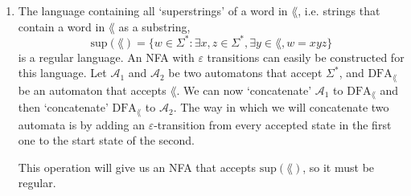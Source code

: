 \documentclass[fleqn]{article}
\begin{document}
\begin{answers}
\begin{enumerate}
		\item %
		The language containing all `superstrings' of a word in \(\lang\), i.e. strings that contain a word in \(\lang\) as a substring,
		\[\text{sup}(\lang) = \{w \in \Sigma^* : \exists x,z \in \Sigma^*, \exists y \in \lang, w=xyz\}\]
		is a regular language. An NFA with \(\varepsilon\) transitions can easily be constructed for this language. Let \(\mathcal{A}_1\) and \(\mathcal{A}_2\) be two automatons that accept \(\Sigma^*\), and \(\text{DFA}_\lang\) be an automaton that accepts \(\lang\). We can now `concatenate' \(\mathcal{A}_1\) to \(\text{DFA}_\lang\) and then `concatenate' \(\text{DFA}_\lang\) to \(\mathcal{A}_2\). The way in which we will concatenate two automata is by adding an \(\varepsilon\)-transition from every accepted state in the first one to the start state of the second.

		This operation will give us an NFA that accepts \(\text{sup}(\lang)\), so it must be regular.


	\end{enumerate}

\end{answers}
\end{document}
